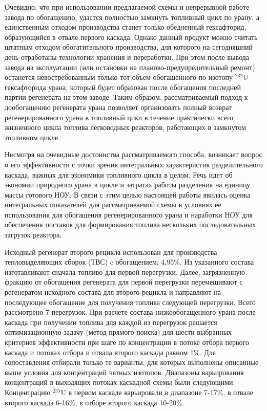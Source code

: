 Очевидно, что при использовании предлагаемой схемы и непрерывной работе завода по обогащению, удастся полностью замкнуть топливный цикл по урану, а единственным отходом производства станет только обедненный гексафторид, образующийся в отвале первого каскада. Однако данный продукт можно считать штатным отходом обогатительного производства, для которого на сегодняшний день отработаны технологии хранения и переработки. При этом после вывода завода из эксплуатации (или остановки на планово-предупредительный ремонт) останется невостребованным только тот объем обогащенного по изотопу $^{232}$U гексафторида урана, который будет образован после обогащения последней партии регенерата на этом заводе. Таким образом, рассматриваемый подход к дообогащению регенерата урана позволяет организовать полный возврат регенерированного урана в топливный цикл в течение практически всего жизненного цикла топлива легководных реакторов, работающих в замкнутом топливном цикле.

Несмотря на очевидные достоинства рассматриваемого способа, возникает вопрос о его эффективности с точки зрения интегральных характеристик разделительного каскада, важных для экономики топливного цикла в целом. Речь идет об экономии природного урана в цикле и затратах работы разделения на единицу массы готового НОУ.
В связи с этим целью настоящей работы явилась оценка интегральных показателей для рассматриваемой схемы в условиях ее использования для обогащения регенерированного урана и наработки НОУ для обеспечения поставок для формирования топлива нескольких последовательных загрузок реактора.

Исходный регенерат второго рецикла использован для производства тепловыделяющих сборок (ТВС) c обогащением: 4,95\%. Из указанного состава изготавливают сначала топливо для первой перегрузки. Далее, загрязненную фракцию от обогащения регенерата для первой перегрузки перемешивают с регенератом исходного состава для второго рецикла и направляют на последующее обогащение для получения топлива следующей перегрузки. Всего рассмотрено 7 перегрузок. При расчете состава низкообогащенного урана после каскада при получении топлива для каждой из перегрузок решается оптимизационную задачу (метод прямого поиска) для шести выбранных критериев эффективности при шаге по концентрации в потоке отбора первого каскада и потоках отбора и отвала второго каскада равном 1\%. Для сопоставления отбирали только те варианты, для которых выполнены описанные выше условия для концентраций четных изотопов. Диапазоны варьирования концентраций в выходящих потоках каскадной схемы были следующими. Концентрацию $^{235}$U в первом каскаде варьировали в диапазоне 7-17\%, в отвале второго каскада 6-16\%, в отборе второго каскада 10-20\%.

